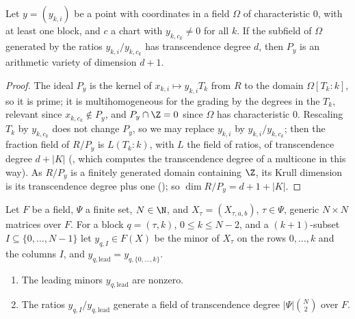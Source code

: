 \begin{lemma}\label{lem:pf:deepstr:trdegpt}
Let $y=(y_{k,i})$ be a point with coordinates in a field $\Omega$ of characteristic $0$, with at least one block, and
$c$ a chart with $y_{k,c_k}\ne0$ for all $k$. If the subfield of $\Omega$ generated by the ratios $y_{k,i}/y_{k,c_k}$ has
transcendence degree $d$, then $P_y$ is an arithmetic variety of dimension $d+1$.
\end{lemma}

\begin{proof}
The ideal $P_y$ is the kernel of $x_{k,i}\mapsto y_{k,i}T_k$ from $R$ to the domain $\Omega[T_k:k]$, so it is prime; it is
multihomogeneous for the grading by the degrees in the $T_k$, relevant since $x_{k,c_k}\notin P_y$, and $P_y\cap\Z=0$
since $\Omega$ has characteristic $0$. Rescaling $T_k$ by $y_{k,c_k}$ does not change $P_y$, so we may replace $y_{k,i}$ by
$y_{k,i}/y_{k,c_k}$; then the fraction field of $R/P_y$ is $L(T_k:k)$, with $L$ the field of ratios, of transcendence
degree $d+|K|$ (, which computes the transcendence degree
of a multicone in this way). As $R/P_y$ is a finitely generated domain containing $\Z$, its Krull dimension is its
transcendence degree plus one (); so
$\dim R/P_y=d+1+|K|$.
\end{proof}

\begin{lemma}\label{lem:pf:deepstr:genflag}
Let $F$ be a field, $\Psi$ a finite set, $N\in\N$, and $X_\tau=(X_{\tau,a,b})$, $\tau\in\Psi$, generic $N\times N$ matrices over
$F$. For a block $q=(\tau,k)$, $0\le k\le N-2$, and a $(k+1)$-subset $I\subseteq\{0,\dots,N-1\}$ let $y_{q,I}\in F(X)$ be the
minor of $X_\tau$ on the rows $0,\dots,k$ and the columns $I$, and $y_{q,\mathrm{lead}}=y_{q,\{0,\dots,k\}}$.
\begin{enumerate}[label=(\alph*)]
\item The leading minors $y_{q,\mathrm{lead}}$ are nonzero.
\item The ratios $y_{q,I}/y_{q,\mathrm{lead}}$ generate a field of transcendence degree $|\Psi|\binom N2$ over $F$.
\end{enumerate}
\end{lemma}

